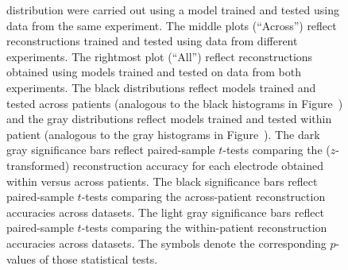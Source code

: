 \documentclass[10pt]{article}
\begin{document}
\begin{figure}[p]
{  distribution were carried out using a model trained and tested using
  data from the same experiment.  The middle plots (``Across'')
  reflect reconstructions trained and tested using data from different
  experiments.  The rightmost plot (``All'') reflect reconstructions
  obtained using models trained and tested on data from both
  experiments.  The black distributions reflect models trained and
  tested across patients (analogous to the black histograms in
  Figure~\corrmaps) and the gray distributions reflect models trained
  and tested within patient (analogous to the gray histograms in
  Figure~\corrmaps).  The dark gray significance bars reflect
  paired-sample $t$-tests comparing the ($z$-transformed)
  reconstruction accuracy for each electrode obtained within versus
  across patients.  The black significance bars reflect paired-sample
  $t$-tests comparing the across-patient reconstruction accuracies
  across datasets.  The light gray significance bars reflect
  paired-sample $t$-tests comparing the within-patient reconstruction
  accuracies across datasets.  The symbols denote the corresponding
  $p$-values of those statistical tests.}
\label{fig:supplemental_1}
\end{figure}
\end{document}
